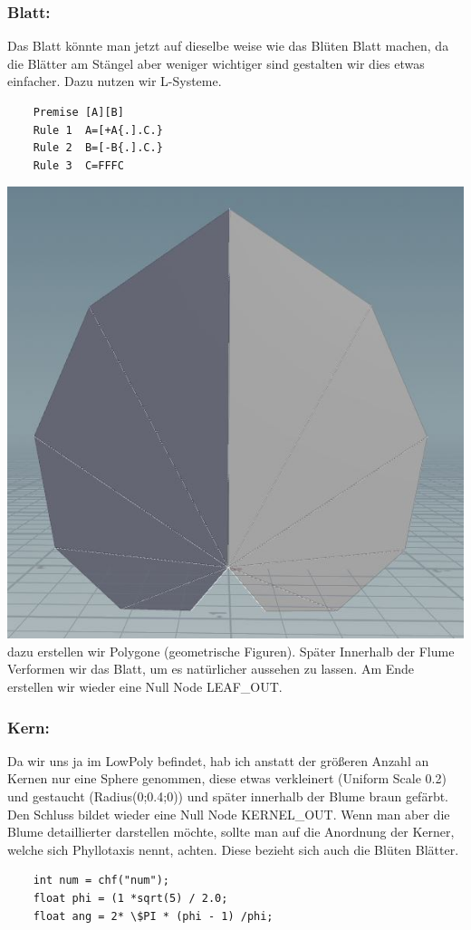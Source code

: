 \begin{​itemize}
\subsubsection*{​Blatt:}
Das Blatt könnte man jetzt auf dieselbe weise wie das Blüten Blatt machen, da die Blätter am Stängel aber weniger wichtiger sind gestalten wir dies etwas einfacher. Dazu nutzen wir L-Systeme.
\begin{lstlisting}
	Premise	[A][B]
	Rule 1	A=[+A{.].C.}
	Rule 2	B=[-B{.].C.}
	Rule 3	C=FFFC
\end{lstlisting} 
\includegraphics*[width=\textwidth]{graphics/leaf1.JPG}
dazu erstellen wir Polygone (geometrische Figuren). Später Innerhalb der Flume Verformen wir das Blatt, um es natürlicher aussehen zu lassen.
Am Ende erstellen wir wieder eine Null Node LEAF_OUT.


\subsubsection*{​Kern:}
Da wir uns ja im LowPoly befindet, hab ich anstatt der größeren Anzahl an Kernen nur eine Sphere genommen, diese etwas verkleinert (Uniform Scale 0.2) und gestaucht (Radius(0;0.4;0)) und später innerhalb der Blume braun gefärbt. Den Schluss bildet wieder eine Null Node KERNEL_OUT.
Wenn man aber die Blume detaillierter darstellen möchte, sollte man auf die Anordnung der Kerner, welche sich Phyllotaxis nennt, achten. Diese bezieht sich auch die Blüten Blätter. 
\begin{lstlisting}
	int num = chf("num");
	float phi = (1 *sqrt(5) / 2.0;
	float ang = 2* \$PI * (phi - 1) /phi;


\end{lstlisting}
\end{​itemize}
